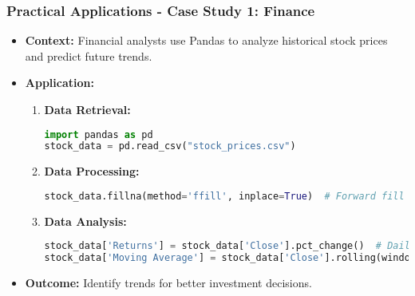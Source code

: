 \documentclass[aspectratio=169]{beamer}
\begin{document}
\begin{frame}[fragile]
    \frametitle{Practical Applications - Case Study 1: Finance}
    
    \begin{itemize}
        \item \textbf{Context:}
        Financial analysts use Pandas to analyze historical stock prices and predict future trends.
        
        \item \textbf{Application:}
        \begin{enumerate}
            \item \textbf{Data Retrieval:}
            \begin{lstlisting}[language=Python]
import pandas as pd
stock_data = pd.read_csv("stock_prices.csv")
            \end{lstlisting}
            
            \item \textbf{Data Processing:}
            \begin{lstlisting}[language=Python]
stock_data.fillna(method='ffill', inplace=True)  # Forward fill
            \end{lstlisting}

            \item \textbf{Data Analysis:}
            \begin{lstlisting}[language=Python]
stock_data['Returns'] = stock_data['Close'].pct_change()  # Daily returns
stock_data['Moving Average'] = stock_data['Close'].rolling(window=30).mean()  # 30-day MA
            \end{lstlisting}
        \end{enumerate}
        
        \item \textbf{Outcome:} Identify trends for better investment decisions.
    \end{itemize}
\end{frame}
\end{document}
